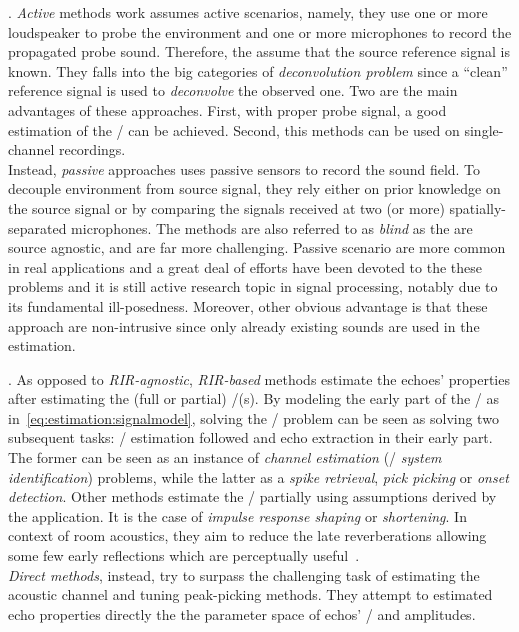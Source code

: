 .
\textit{Active} methods work assumes active scenarios, namely, they use one or more loudspeaker to probe the environment and one or more microphones to record the propagated probe sound.
Therefore, the assume that the source reference signal is known.
They falls into the big categories of \textit{deconvolution problem} since a ``clean'' reference signal is used to \textit{deconvolve} the observed one.
Two are the main advantages of these approaches.
First, with proper probe signal, a good estimation of the \RIR/ can be achieved.
Second, this methods can be used on single-channel recordings.
\\Instead, \textit{passive} approaches uses passive sensors to record the sound field.
To decouple environment from source signal, they rely either on prior knowledge on the source signal or by comparing the signals received at two (or more) spatially-separated microphones.
The methods are also referred to as \textit{blind} as the are source agnostic, and are far more challenging.
Passive scenario are more common in real applications and a great deal of efforts have been devoted to the these problems and it is still active research topic in signal processing, notably due to its fundamental ill-posedness.
Moreover, other obvious advantage is that these approach are non-intrusive since only already existing sounds are used in the estimation.

.
As opposed to \textit{RIR-agnostic}, \textit{RIR-based} methods estimate the echoes' properties after estimating the (full or partial) \RIR/(s).
By modeling the early part of the \RIR/ as in~\cref{eq:estimation:signalmodel}, solving the \AER/ problem can be seen as solving two subsequent tasks: \RIR/ estimation followed and echo extraction in their early part.
The former can be seen as an instance of \textit{channel estimation} (\aka/ \textit{system identification}) problems, while the latter as a \textit{spike retrieval}, \textit{pick picking} or \textit{onset detection}.
Other methods estimate the \RIRs/ partially using assumptions derived by the application.
It is the case of \textit{impulse response shaping} or \textit{shortening}.
In context of room acoustics, they aim to reduce the late reverberations allowing some few early reflections which are perceptually useful~.
\\\textit{Direct methods}, instead, try to surpass the challenging task of estimating the acoustic channel and tuning peak-picking methods.
They attempt to estimated echo properties directly the the parameter space of echos' \TOAs/ and amplitudes.

